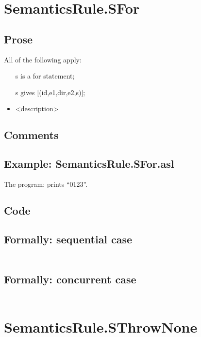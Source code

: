 \documentclass{book}
\begin{document}
\section{SemanticsRule.SFor \label{sec:SemanticsRule.SFor}}

    \subsection{Prose}
    All of the following apply:
    \begin{itemize}
    \item [s] is a for statement;
    \item [s] gives [(id,e1,dir,e2,s)];
    \item <description>
    \end{itemize}

    \subsection{Comments}

    \subsection{Example: SemanticsRule.SFor.asl}
    The program:
    prints ``0123''.

  \subsection{Code}

  \subsection{Formally: sequential case}
  \begin{align}
  \end{align} 

  \subsection{Formally: concurrent case}
  \begin{align}
  \end{align} 

\section{SemanticsRule.SThrowNone \label{sec:SemanticsRule.SThrowNone}}
\end{document}
